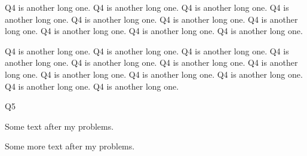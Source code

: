 \documentclass{ximera}
\begin{document}
\begin{question}
	Q4 is another long one. Q4 is another long one. Q4 is another long one. Q4 is another long one. Q4 is another long one. Q4 is another long one. Q4 is another long one. Q4 is another long one. Q4 is another long one. Q4 is another long one. 
	
	Q4 is another long one. Q4 is another long one. Q4 is another long one. Q4 is another long one. Q4 is another long one. Q4 is another long one. Q4 is another long one. Q4 is another long one. Q4 is another long one. Q4 is another long one. Q4 is another long one. Q4 is another long one. 
\end{question}

\begin{exploration}
	Q5
\end{exploration}

Some text after my problems.

Some more text after my problems.
\end{document}
